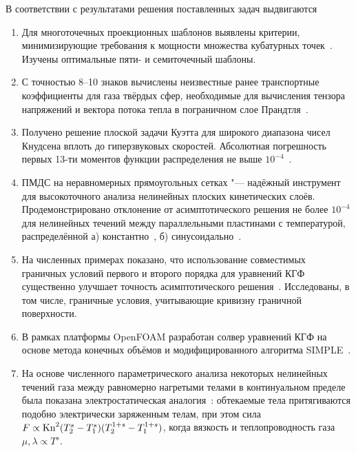 В соответствии с результатами решения поставленных задач выдвигаются {}
\begin{enumerate}
    \item\label{defpos:stencils} %
    Для многоточечных проекционных шаблонов выявлены критерии,
    минимизирующие требования к мощности множества кубатурных точек~\cite{Rogozin2016}.
    Изучены оптимальные пяти- и семиточечный шаблоны.
    \item\label{defpos:transport_coeffs} %
    С точностью 8--10 знаков вычислены неизвестные ранее транспортные коэффициенты для газа твёрдых сфер,
    необходимые для вычисления тензора напряжений и вектора потока тепла в пограничном слое Прандтля~\cite{Rogozin2016}.
    \item\label{defpos:Couette_flow} %
    Получено решение плоской задачи Куэтта для широкого диапазона чисел Кнудсена вплоть до гиперзвуковых скоростей.
    Абсолютная погрешность первых 13-ти моментов функции распределения не выше \(10^{-4}\)~\cite{Rogozin2016}.
    \item\label{defpos:asymptotic_verification} %
    ПМДС на неравномерных прямоугольных сетках "--- надёжный инструмент для высокоточного анализа
    нелинейных плоских кинетических слоёв. Продемонстрировано отклонение от асимптотического
    решения не более \(10^{-4}\) для нелинейных течений между параллельными пластинами с температурой,
    распределённой а) константно~\cite{Rogozin2016}, б) синусоидально~\cite{Rogozin2017}.
    \item\label{defpos:boundary_conditions} %
    На численных примерах показано, что использование совместимых граничных условий первого и второго порядка
    для уравнений КГФ существенно улучшает точность асимптотического решения~\cite{Rogozin2017}.
    Исследованы, в том числе, граничные условия, учитывающие кривизну граничной поверхности.
    \item\label{defpos:snit_solver} %
    В рамках платформы OpenFOAM разработан солвер уравнений КГФ
    на основе метода конечных объёмов и модифицированного алгоритма SIMPLE~\cite{Rogozin2014}.
    \item\label{defpos:snit_forces} %
    На основе численного параметрического анализа некоторых нелинейных течений газа
    между равномерно нагретыми телами в континуальном пределе была показана
    электростатическая аналогия~\cite{Rogozin2014}:
    обтекаемые тела притягиваются подобно электрически заряженным телам,
    при этом сила \(F\propto\mathrm{Kn}^2(T_2^s-T_1^s)(T_2^{1+s}-T_1^{1+s})\),
    когда вязкость и теплопроводность газа \(\mu, \lambda \propto T^s\).
\end{enumerate}

